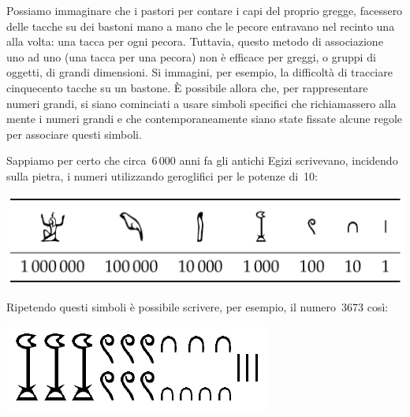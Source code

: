 Possiamo immaginare che i pastori per contare i capi del proprio gregge, 
facessero delle tacche su dei bastoni mano a mano che le pecore entravano 
nel recinto una alla volta: una tacca per ogni pecora. 
Tuttavia, questo metodo di associazione uno ad uno (una tacca per una 
pecora) non è efficace per greggi, o gruppi di oggetti, di grandi 
dimensioni. 
Si immagini, per esempio, la difficoltà di tracciare cinquecento tacche su 
un bastone. 
È possibile allora che, per rappresentare numeri grandi, si siano cominciati 
a usare simboli specifici che richiamassero alla mente i numeri grandi e 
che contemporaneamente siano state fissate alcune regole per associare 
questi simboli.

Sappiamo per certo che circa~6\,000 anni fa gli antichi Egizi scrivevano, 
incidendo sulla pietra, i numeri utilizzando geroglifici per le potenze 
di~10:

% 
\begin{inaccessibleblock}
\vspace{-2ex}
\begin{center} 
\includegraphics[scale=0.28]{img/hieropotdieci.png} 
\end{center}
\vspace{-2ex}
\end{inaccessibleblock}
                                                                  
Ripetendo questi simboli è possibile scrivere, per esempio, il numero~3673 
così:

\begin{inaccessibleblock}
\vspace{-2ex}
\begin{center} \includegraphics[scale=0.25]{img/hiero3673.png} \end{center}
\vspace{-2ex}
\end{inaccessibleblock}


